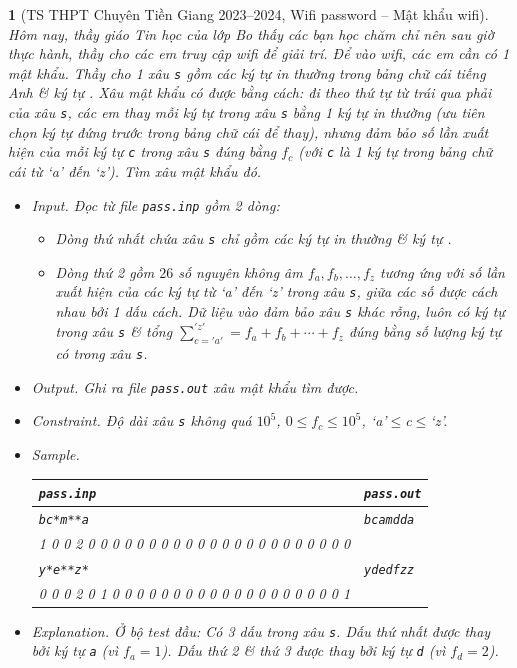\documentclass{article}
\newtheorem{baitoan}{}
\begin{document}
\begin{baitoan}[TS THPT Chuyên Tiền Giang 2023--2024, Wifi password -- Mật khẩu wifi]
	Hôm nay, thầy giáo Tin học của lớp Bo thấy các bạn học chăm chỉ nên sau giờ thực hành, thầy cho các em truy cập wifi để giải trí. Để vào wifi, các em cần có 1 mật khẩu. Thầy cho 1 xâu {\tt s} gồm các ký tự in thường trong bảng chữ cái tiếng Anh \& ký tự {\tt*}. Xâu mật khẩu có được bằng cách: đi theo thứ tự từ trái qua phải của xâu {\tt s}, các em thay mỗi ký tự {\tt*} trong xâu {\tt s} bằng 1 ký tự in thường (ưu tiên chọn ký tự đứng trước trong bảng chữ cái để thay), nhưng đảm bảo số lần xuất hiện của mỗi ký tự {\tt c} trong xâu {\tt s} đúng bằng $f_c$ (với {\tt c} là 1 ký tự trong bảng chữ cái từ `a' đến `z'). Tìm xâu mật khẩu đó.
	\begin{itemize}
		\item {\sf Input.} Đọc từ file {\tt pass.inp} gồm 2 dòng:
		\begin{itemize}
			\item Dòng thứ nhất chứa xâu {\tt s} chỉ gồm các ký tự in thường \& ký tự {\tt*}.
			\item Dòng thứ 2 gồm $26$ số nguyên không âm $f_a,f_b,\ldots,f_z$ tương ứng với số lần xuất hiện của các ký tự từ `a' đến `z' trong xâu {\tt s}, giữa các số được cách nhau bởi 1 dấu cách. Dữ liệu vào đảm bảo xâu {\tt s} khác rỗng, luôn có ký tự {\tt*} trong xâu {\tt s} \& tổng $\sum_{c='a'}^{'z'} = f_a + f_b + \cdots + f_z$ đúng bằng số lượng ký tự {\tt*} có trong xâu {\tt s}.
		\end{itemize}
		\item {\sf Output.} Ghi ra file {\tt pass.out} xâu mật khẩu tìm được.
		\item {\sf Constraint.} Độ dài xâu {\tt s} không quá $10^5$, $0\le f_c\le10^5$, `a'$\le$c$\le$`z'.
		\item {\sf Sample.}
		\begin{table}[H]
			\centering
			\begin{tabular}{|l|l|}
				\hline
				\texttt{pass.inp} & \texttt{pass.out} \\
				\hline
				\texttt{bc*m**a} & \texttt{bcamdda} \\
				1 0 0 2 0 0 0 0 0 0 0 0 0 0 0 0 0 0 0 0 0 0 0 0 0 0 & \\
				\hline
				\texttt{y*e**z*} & \texttt{ydedfzz} \\
				0 0 0 2 0 1 0 0 0 0 0 0 0 0 0 0 0 0 0 0 0 0 0 0 0 1 & \\
				\hline
			\end{tabular}
		\end{table}
		\item {\sf Explanation.} Ở bộ test đầu: Có 3 dấu {\tt*} trong xâu {\tt s}. Dấu {\tt*} thứ nhất được thay bởi ký tự {\tt a} (vì $f_a = 1$). Dấu {\tt*}  thứ 2 \& thứ 3 được thay bởi ký tự {\tt d} (vì $f_d = 2$).
	\end{itemize}
\end{baitoan}
\end{document}
